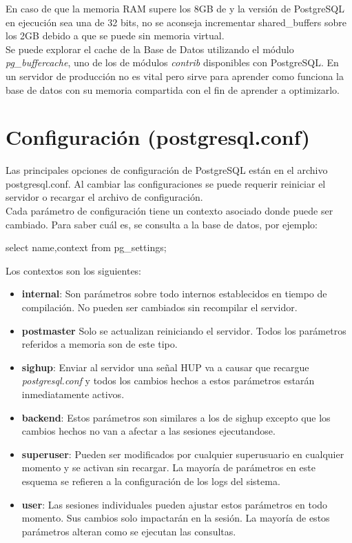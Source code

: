 En caso de que la memoria RAM supere los 8GB de y la versión de PostgreSQL en ejecución sea una de 32 bits, no se aconseja incrementar shared\_buffers sobre los 2GB debido a que se puede sin memoria virtual.\\

Se puede explorar el cache de la Base de Datos utilizando el módulo \textit{pg\_buffercache}, uno de los de módulos \textit{contrib} disponibles con PostgreSQL. En un servidor de producción no es vital pero sirve para aprender como funciona la base de datos con su memoria compartida con el fin de aprender a optimizarlo.


\section{Configuración (postgresql.conf)}

Las principales opciones de configuración de PostgreSQL están en el archivo postgresql.conf. Al cambiar las configuraciones se puede requerir reiniciar el servidor o recargar el archivo de configuración.\\

Cada parámetro de configuración tiene un contexto asociado donde puede ser cambiado. Para saber cuál es, se consulta a la base de datos, por ejemplo:\\

\begin{pyglist}
select name,context from pg_settings;
\end{pyglist}

Los contextos son los siguientes:

\begin{itemize}
\item \textbf{internal}: Son parámetros sobre todo internos establecidos en tiempo de compilación. No pueden ser cambiados sin recompilar el servidor.
\item \textbf{postmaster} Solo se actualizan reiniciando el servidor. Todos los parámetros referidos a memoria son de este tipo.
\item \textbf{sighup}: Enviar al servidor una señal HUP va a causar que recargue \textit{postgresql.conf} y todos los cambios hechos a estos parámetros estarán inmediatamente activos.
\item \textbf{backend}: Estos parámetros son similares a los de sighup excepto que los cambios hechos no van a afectar a las sesiones ejecutandose.
\item \textbf{superuser}: Pueden ser modificados por cualquier superusuario en cualquier momento y se activan sin recargar. La mayoría de parámetros en este esquema se refieren a la configuración de los logs del sistema.
\item \textbf{user}: Las sesiones individuales pueden ajustar estos parámetros en todo momento. Sus cambios solo impactarán en la sesión. La mayoría de estos parámetros alteran como se ejecutan las consultas.
\end{itemize}


